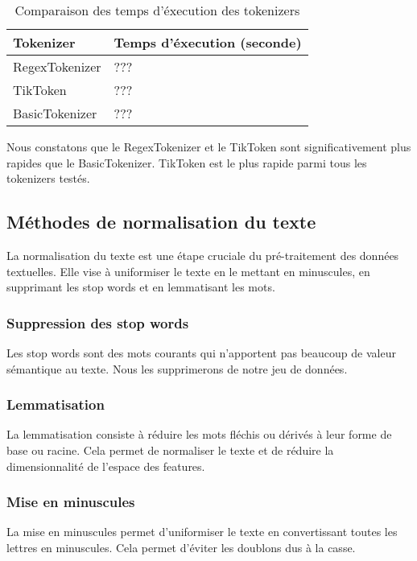 \begin{table}[h]
\centering
\begin{tabular}{|l|l|}
\hline
\textbf{Tokenizer} & \textbf{Temps d'éxecution (seconde)} \\ \hline
RegexTokenizer & ??? \\ \hline
TikToken & ??? \\ \hline
BasicTokenizer & ??? \\ \hline
\end{tabular}
\caption{Comparaison des temps d'éxecution des tokenizers}
\end{table}


Nous constatons que le RegexTokenizer et le TikToken sont significativement plus rapides que le BasicTokenizer. TikToken est le plus rapide parmi tous les tokenizers testés.

\subsection{Méthodes de normalisation du texte}

La normalisation du texte est une étape cruciale du pré-traitement des données textuelles. Elle vise à uniformiser le texte en le mettant en minuscules, en supprimant les stop words et en lemmatisant les mots.

\subsubsection*{Suppression des stop words}

Les stop words sont des mots courants qui n'apportent pas beaucoup de valeur sémantique au texte. Nous les supprimerons de notre jeu de données.

\subsubsection*{Lemmatisation}

La lemmatisation consiste à réduire les mots fléchis ou dérivés à leur forme de base ou racine. Cela permet de normaliser le texte et de réduire la dimensionnalité de l'espace des features.

\subsubsection*{Mise en minuscules}

La mise en minuscules permet d'uniformiser le texte en convertissant toutes les lettres en minuscules. Cela permet d'éviter les doublons dus à la casse.

